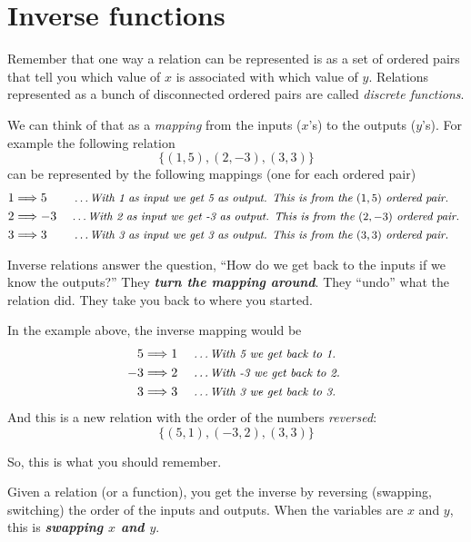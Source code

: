 \section*{Inverse functions}

Remember that one way a relation can be represented
is as a set of ordered pairs that tell you
which value of $x$ is associated with 
which value of $y$.
Relations represented as a bunch of disconnected ordered pairs 
are called \emph{discrete functions}.

We can think of that as a \emph{mapping}
from the inputs ($x$'s) to the outputs ($y$'s).
For example the following relation 
\[  
    \{ (1,5), (2,-3), (3,3) \}
\]
can be represented by the following mappings
(one for each ordered pair)
\begin{align*}
    1 &\Longrightarrow 5
    \text{
        \small\itshape\qquad
        \dots With 1 as input we get 5 as output.
        This is from the $(1,5)$ ordered pair.
    }\\
    2 &\Longrightarrow -3
    \text{
        \small\itshape\quad
        \dots With 2 as input we get -3 as output.
        This is from the $(2,-3)$ ordered pair.
    } \\
    3 &\Longrightarrow 3
    \text{
        \small\itshape\qquad
        \dots With 3 as input we get 3 as output.
        This is from the $(3,3)$ ordered pair.
    }
\end{align*}

Inverse relations answer the question, 
``How do we get back to the inputs if we know the outputs?''
They {\bfseries\itshape turn the mapping around}.
They ``undo'' what the relation did.
They take you back to where you started.

In the example above,
the inverse mapping would be
\begin{align*} 
    5 &\Longrightarrow 1
    \text{
        \small\itshape\quad
        \dots With 5 we get back to 1.
    }\\
    -3 &\Longrightarrow 2
    \text{
        \small\itshape\quad
        \dots With -3 we get back to 2.
    } \\
    3 &\Longrightarrow 3
    \text{
        \small\itshape\quad
        \dots With 3 we get back to 3.
    }
\end{align*}
And this is a new relation with the order of the numbers \emph{reversed}:
\[  
    \{ (5,1), (-3,2), (3,3) \}
\]

So, this is what you should remember.
\begin{center}
    \begin{tcolorbox}[width=4in]
        Given a relation (or a function),
        you get the inverse by reversing (swapping, switching) 
        the order of the inputs and outputs.
        When the variables are $x$ and $y$, 
        this is {\bfseries\itshape swapping $x$ and $y$}.
    \end{tcolorbox}
\end{center}